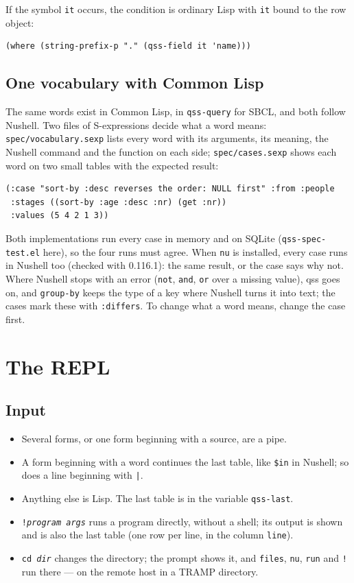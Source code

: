 \documentclass[
  paper=a4, fontsize=11pt, parskip=half, headings=small,
  toc=bibliography, numbers=noenddot, DIV=12
]{scrreprt}
\newcommand{\code}[1]{\texttt{#1}}
\newcommand{\file}[1]{\texttt{#1}}
\newcommand{\qss}{\textsf{qss}}
\begin{document}
If the symbol \code{it} occurs, the condition is ordinary Lisp with \code{it}
bound to the row object:

\begin{lstlisting}
(where (string-prefix-p "." (qss-field it 'name)))
\end{lstlisting}

\section{One vocabulary with Common Lisp}

The same words exist in Common Lisp, in \code{qss-query} for SBCL, and both
follow Nushell. Two files of S-expressions decide what a word means:
\file{spec/vocabulary.sexp} lists every word with its arguments, its meaning,
the Nushell command and the function on each side; \file{spec/cases.sexp}
shows each word on two small tables with the expected result:

\begin{lstlisting}
(:case "sort-by :desc reverses the order: NULL first" :from :people
 :stages ((sort-by :age :desc :nr) (get :nr))
 :values (5 4 2 1 3))
\end{lstlisting}

Both implementations run every case in memory and on SQLite
(\file{qss-spec-test.el} here), so the four runs must agree. When \code{nu} is
installed, every case runs in Nushell too (checked with 0.116.1): the same
result, or the case says why not. Where Nushell stops with an error
(\code{not}, \code{and}, \code{or} over a missing value), \qss{} goes on, and
\code{group-by} keeps the type of a key where Nushell turns it into text; the
cases mark these with \code{:differs}. To change what a word means, change the
case first.

\chapter{The REPL}

\section{Input}

\begin{itemize}
\item Several forms, or one form beginning with a source, are a pipe.
\item A form beginning with a word continues the last table, like \code{\$in}
  in Nushell; so does a line beginning with \code{|}.
\item Anything else is Lisp. The last table is in the variable
  \code{qss-last}.
\item \code{!\emph{program} \emph{args}} runs a program directly, without a
  shell; its output is shown and is also the last table (one row per line, in
  the column \code{line}).
\item \code{cd \emph{dir}} changes the directory; the prompt shows it, and
  \code{files}, \code{nu}, \code{run} and \code{!} run there --- on the remote
  host in a TRAMP directory.
\end{itemize}
\end{document}
